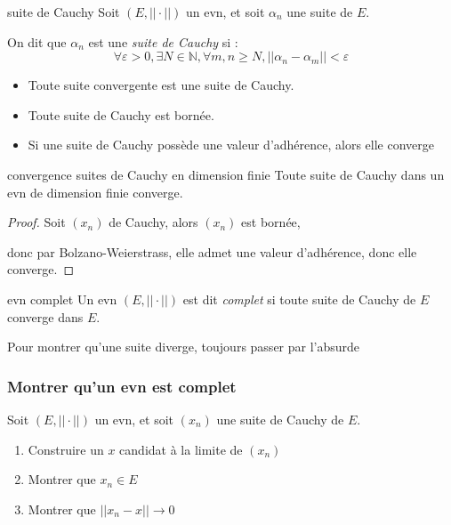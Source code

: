 \begin{definition}{suite de Cauchy}{}
    Soit $(E, ||\cdot||)$ un evn, et soit $\alpha_n$ une suite de $E$. 

    On dit que $\alpha_n$ est une \emph{suite de Cauchy} si :
    \[
        \forall \varepsilon > 0, \exists N \in \mathbb{N}, \forall m,n \geqslant N, ||\alpha_n - \alpha_m|| < \varepsilon
    \]
\end{definition}

\begin{propriete}{}{}
    \begin{itemize}
        \item Toute suite convergente est une suite de Cauchy.
        \item Toute suite de Cauchy est bornée.
        \item Si une suite de Cauchy possède une valeur d'adhérence, alors elle converge
    \end{itemize}
\end{propriete}

\begin{theoreme}{convergence suites de Cauchy en dimension finie}{}
    Toute suite de Cauchy dans un evn de dimension finie converge.
\end{theoreme}

\begin{proof}
    Soit $(x_n)$ de Cauchy, alors $(x_n)$ est bornée, 
    
    donc par Bolzano-Weierstrass, elle admet une valeur d'adhérence, 
    donc elle converge.
\end{proof}

\begin{definition}{evn complet}{}
    Un evn $(E, ||\cdot||)$ est dit \emph{complet} si toute suite de Cauchy de $E$ converge dans $E$.
\end{definition}

\begin{remarque}
    Pour montrer qu'une suite diverge, toujours passer par l'absurde 
\end{remarque}

\subsubsection{Montrer qu'un evn est complet}

Soit $(E, ||\cdot||)$ un evn, et soit $(x_n)$ une suite de Cauchy de $E$.

\begin{enumerate}
    \item Construire un $x$ candidat à la limite de $(x_n)$
    \item Montrer que $x_n \in E$
    \item Montrer que $||x_n - x|| \to 0$
\end{enumerate}


